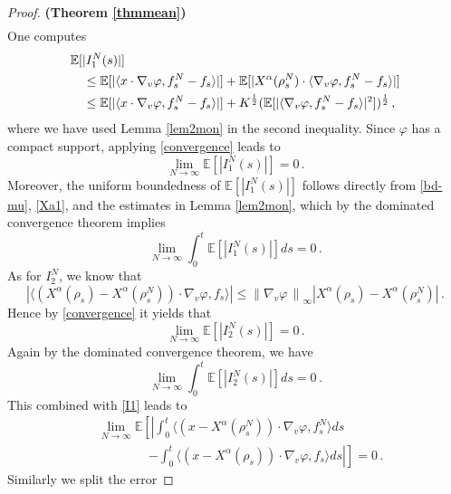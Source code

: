 \documentclass{ims9x6}
\newcommand{\nn}{\nonumber}
\newcommand{\EE}{\mathbb{E}}
\newcommand{\la}{\langle}
\newcommand{\ra}{\rangle}
\newcommand{\norm}[1]{\left\lVert#1 \, \right\rVert}
\begin{document}
\begin{proof}{\textbf{(Theorem \ref{thmmean})}}
\begin{align*}
		\end{align*}
	One computes
	\begin{align*}
	&\EE[|I_1^N(s)|]\nn\\
	&\quad \leq \EE[|\la x\cdot \nabla_v \varphi,f_s^N -f_s \ra|]+\EE[|X^\alpha(\rho_s^N) \cdot \la\nabla_v \varphi,f_s^N-f_s \ra|]\notag\\
	&\quad \leq \EE[|\la x\cdot \nabla_v \varphi,f_s^N -f_s \ra|]+K^{\frac{1}{2}}(\EE[| \la\nabla_v \varphi,f_s^N -f_s \ra|^2])^\frac{1}{2}\,,
	\end{align*}
	where we have used Lemma \ref{lem2mon} in the second inequality.
	Since $\varphi$ has a compact support, applying \eqref{convergence} leads to 
	\begin{equation}
	\lim\limits_{N\to \infty }\EE\left[|I_1^N(s)|\right]=0\,.
	\end{equation}
	Moreover, the uniform boundedness of $\EE\left[|I_1^N(s)|\right]$ follows directly from \eqref{bd-mu}, \eqref{Xa1}, and the estimates in Lemma \ref{lem2mon}, which by the dominated convergence theorem implies
	\begin{equation}\label{I1}
	\lim\limits_{N\to \infty }\int _0^t\EE[|I_1^N(s)|]ds=0\,.
	\end{equation}
	As for  $I_2^N$, we know that
	\begin{equation}
	\left|\la (X^\alpha(\rho_s)-X^\alpha(\rho_s^N))\cdot \nabla_v\varphi, f_s \ra\right|\leq \norm{\nabla_v \varphi}_\infty  |X^\alpha(\rho_s)-X^\alpha(\rho_s^N)|\,.
	\end{equation}
	Hence by \eqref{convergence} it yields that
	\begin{equation}
	\lim\limits_{N\to \infty }\EE[|I_2^N(s)|]=0\,.
	\end{equation}
	Again by the dominated convergence theorem, we have
	\begin{equation}
	\lim\limits_{N\to \infty }\int _0^t\EE[|I_2^N(s)|]ds=0\,.
	\end{equation}
	This combined with \eqref{I1} leads to
{\small 	\begin{equation}
\begin{split}\label{est2}
	&\lim_{N\rightarrow \infty}	\EE\left[\left|\int_0^t\la (x-X^\alpha(\rho_s^N))\cdot \nabla_v\varphi, f_s^N \ra ds\right.\right.\\
	&\qquad\qquad\left.\left. -\int_0^t\la (x-X^\alpha(\rho_s))\cdot \nabla_v\varphi, f_s \ra ds\right|\right]=0\,.
	\end{split}\end{equation}}
	Similarly we split the error

\end{proof}
\end{document}
